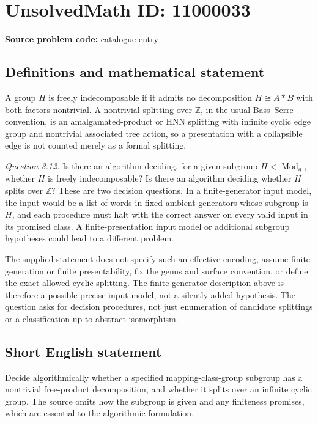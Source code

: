 \documentclass[11pt]{article}
\newcommand{\Z}{\mathbb{Z}}
\begin{document}
\section*{UnsolvedMath ID: 11000033}
\textbf{Source problem code:} catalogue entry
\subsection{Definitions and mathematical statement}
A group \(H\) is freely indecomposable if it admits no decomposition \(H\cong A*B\) with both factors nontrivial. A nontrivial splitting over \(\Z\), in the usual Bass--Serre convention, is an amalgamated-product or HNN splitting with infinite cyclic edge group and nontrivial associated tree action, so a presentation with a collapsible edge is not counted merely as a formal splitting.

\emph{Question 3.12.} Is there an algorithm deciding, for a given subgroup \(H<\operatorname{Mod}_g\), whether \(H\) is freely indecomposable? Is there an algorithm deciding whether \(H\) splits over \(\Z\)? These are two decision questions. In a finite-generator input model, the input would be a list of words in fixed ambient generators whose subgroup is \(H\), and each procedure must halt with the correct answer on every valid input in its promised class. A finite-presentation input model or additional subgroup hypotheses could lead to a different problem.

The supplied statement does not specify such an effective encoding, assume finite generation or finite presentability, fix the genus and surface convention, or define the exact allowed cyclic splitting. The finite-generator description above is therefore a possible precise input model, not a silently added hypothesis. The question asks for decision procedures, not just enumeration of candidate splittings or a classification up to abstract isomorphism.
\subsection{Short English statement}
Decide algorithmically whether a specified mapping-class-group subgroup has a nontrivial free-product decomposition, and whether it splits over an infinite cyclic group. The source omits how the subgroup is given and any finiteness promises, which are essential to the algorithmic formulation.
\end{document}
